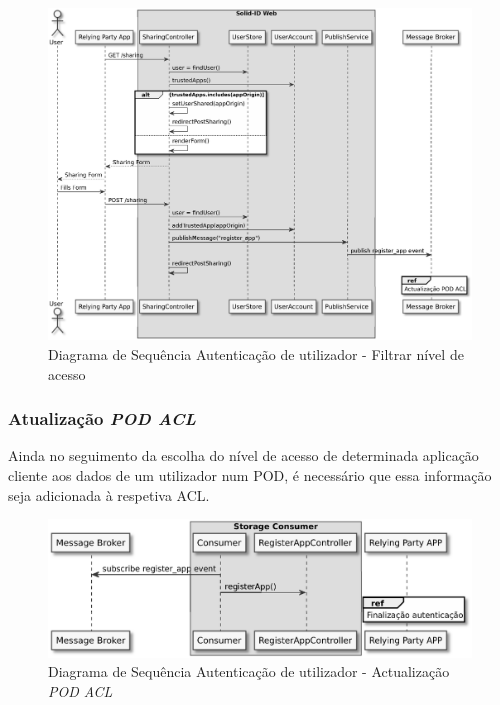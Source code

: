 \begin{figure}[h]
    \begin{center}
    \includegraphics[width=1 \textwidth]{figures/authentication_sd_2.eps}
    \caption{Diagrama de Sequência Autenticação de utilizador - Filtrar nível de acesso}
            \label{autenticacao_sd2}
    \end{center}
\end{figure}

\subsubsection{Atualização \emph{POD ACL}}
Ainda no seguimento da escolha do nível de acesso de determinada aplicação cliente aos dados de um utilizador num POD, é necessário que essa informação seja adicionada à respetiva ACL.

\begin{figure}[h]
    \begin{center}
    \includegraphics[height=0.3 \textwidth]{figures/authentication_sd_3.eps}
    \caption{Diagrama de Sequência Autenticação de utilizador - Actualização \emph{POD ACL}}
    \label{autenticacao_sd3}
    \end{center}
\end{figure}


